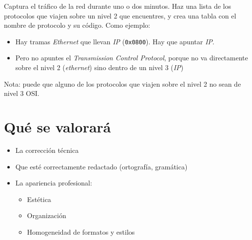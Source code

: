 \begin{homeworkProblem}
  Captura el tráfico de la red durante uno o dos minutos. Haz una lista de los protocolos que viajen sobre un nivel 2 que encuentres, y crea una tabla con el nombre de protocolo y su código. Como ejemplo:
  \begin{itemize}
  \item Hay tramas \textit{Ethernet} que llevan \textit{IP} (\texttt{0x0800}). Hay que apuntar \textit{IP}.
  \item Pero no apuntes el \textit{Transmission Control  Protocol}, porque no va directamente sobre el nivel 2 (\textit{ethernet}) sino dentro de un nivel 3 (\textit{IP})
\end{itemize}
  \small{Nota: puede que alguno de los protocolos que viajen sobre el nivel 2 no sean de nivel 3 OSI.}
\end{homeworkProblem}



\clearpage
\section{Qué se valorará}

\begin{itemize}
\item La corrección técnica 
\item Que esté correctamente redactado (ortografía, gramática)
\item La apariencia profesional:
  \begin{itemize}
  \item Estética
  \item Organización
  \item Homogeneidad de formatos y estilos
  \end{itemize}
\end{itemize}

